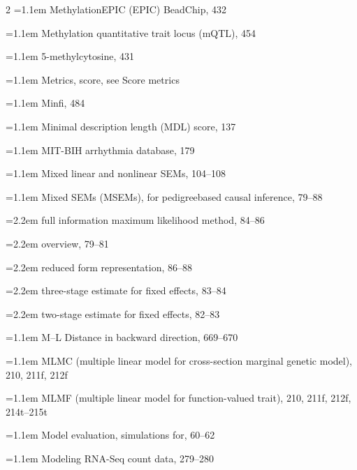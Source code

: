 \begin{multicols}{2}
\noindent\hangindent=1.1em MethylationEPIC (EPIC) BeadChip, 432\par
\noindent\hangindent=1.1em Methylation quantitative trait locus (mQTL), 454\par
\noindent\hangindent=1.1em 5-methylcytosine, 431\par
\noindent\hangindent=1.1em Metrics, score, see Score metrics\par
\noindent\hangindent=1.1em Minfi, 484\par
\noindent\hangindent=1.1em Minimal description length (MDL) score, 137\par
\noindent\hangindent=1.1em MIT-BIH arrhythmia database, 179\par
\noindent\hangindent=1.1em Mixed linear and nonlinear SEMs, 104--108\par
\noindent\hangindent=1.1em Mixed SEMs (MSEMs), for pedigreebased causal inference, 79--88\par
\noindent\hangindent=2.2em \hspace*{1.1em}full information maximum likelihood method, 84--86\par
\noindent\hangindent=2.2em \hspace*{1.1em}overview, 79--81\par
\noindent\hangindent=2.2em \hspace*{1.1em}reduced form representation, 86--88\par
\noindent\hangindent=2.2em \hspace*{1.1em}three-stage estimate for fixed effects, 83--84\par
\noindent\hangindent=2.2em \hspace*{1.1em}two-stage estimate for fixed effects, 82--83\par
\noindent\hangindent=1.1em M--L Distance in backward direction, 669--670\par
\noindent\hangindent=1.1em MLMC (multiple linear model for cross-section marginal genetic model), 210, 211f, 212f\par
\noindent\hangindent=1.1em MLMF (multiple linear model for function-valued trait), 210, 211f, 212f, 214t--215t\par
\noindent\hangindent=1.1em Model evaluation, simulations for, 60--62\par
\noindent\hangindent=1.1em Modeling RNA-Seq count data, 279--280\par

\end{multicols}
